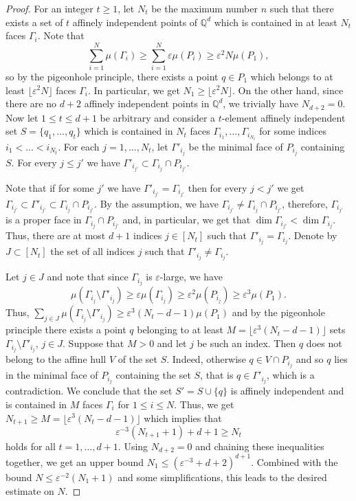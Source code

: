 \documentclass{daj}
\renewcommand{\le}{\leqslant}
\renewcommand{\ge}{\geqslant}
\newcommand{\Q}{\mathbb Q}
\theoremstyle{definition}
\theoremstyle{remark}
\theoremstyle{definition}
\theoremstyle{definition}
\begin{document}
\begin{proof}
For an integer $t\ge 1$, let $N_t$ be the maximum number $n$ such that there exists a set of $t$ affinely independent points of $\Q^d$ which is contained in at least $N_t$ faces $\Gamma_i$. Note that
$$
\sum_{i=1}^N \mu(\Gamma_i) \ge \sum_{i=1}^N \varepsilon\mu(P_i)\ge \varepsilon^2 N \mu(P_1), 
$$
so by the pigeonhole principle, there exists a point $q \in P_1$ which belongs to at least $\lfloor \varepsilon^2 N\rfloor$ faces $\Gamma_i$. In particular, we get $N_1 \ge \lfloor\varepsilon^2 N\rfloor$. On the other hand, since there are no $d+2$ affinely independent points in $\Q^d$, we trivially have $N_{d+2} = 0$. Now let $1\le t \le d+1$ be arbitrary and consider a $t$-element affinely independent set $S= \{q_1, \ldots, q_t\}$ which is contained in $N_t$ faces $\Gamma_{i_1}, \ldots, \Gamma_{i_{N_t}}$ for some indices $i_1 < \ldots < i_{N_t}$. For each $j=1, \ldots, N_t$, let $\Gamma'_{i_j}$ be the minimal face of $P_{i_j}$ containing $S$. For every $j\le j'$ we have $\Gamma'_{i_{j'}} \subset \Gamma_{i_j} \cap P_{i_{j'}}$.

Note that if for some $j'$ we have $\Gamma'_{i_{j'}} = \Gamma_{i_{j'}}$ then for every $j < j'$ we get $\Gamma_{i_{j'}} \subset \Gamma'_{i_{j'}} \subset \Gamma_{i_j} \cap P_{i_{j'}}$. By the assumption, we have $\Gamma_{i_{j'}} \neq \Gamma_{i_j} \cap P_{i_{j'}}$, therefore, $\Gamma_{i_{j'}}$ is a proper face in $\Gamma_{i_j} \cap P_{i_{j'}}$ and, in particular, we get that $\dim \Gamma_{i_{j'}} < \dim \Gamma_{i_j}$. Thus, there are at most $d+1$ indices $j \in [N_t]$ such that $\Gamma'_{i_j} = \Gamma_{i_j}$. Denote by $J \subset [N_t]$ the set of all indices $j$ such that $\Gamma'_{i_j} \neq \Gamma_{i_j}$. 

Let $j \in J$ and note that since $\Gamma_{i_j}$ is $\varepsilon$-large, we have 
$$
\mu(\Gamma_{i_j} \setminus \Gamma'_{i_j}) \ge \varepsilon \mu(\Gamma_{i_j}) \ge \varepsilon^2 \mu(P_{i_j}) \ge \varepsilon^3 \mu(P_1).
$$
Thus, $\sum_{j\in J} \mu(\Gamma_{i_j} \setminus \Gamma'_{i_j}) \ge \varepsilon^3 (N_t - d-1) \mu(P_1)$ and by the pigeonhole principle there exists a point $q$ belonging to at least $M = \lfloor \varepsilon^3 (N_t - d-1)\rfloor$ sets $\Gamma_{i_j} \setminus \Gamma'_{i_j}$, $j\in J$. Suppose that $M > 0$ and let $j$ be such an index. Then $q$ does not belong to the affine hull $V$ of the set $S$. Indeed, otherwise $q \in V \cap P_{i_j}$ and so $q$ lies in the minimal face of $P_{i_j}$ containing the set $S$, that is $q \in \Gamma'_{i_j}$, which is a contradiction. We conclude that the set $S' = S \cup \{q\}$ is affinely independent and is contained in $M$ faces $\Gamma_i$ for $1\le i\le N$. Thus, we get $N_{t+1} \ge M = \lfloor \varepsilon^3 (N_t - d-1)\rfloor$ which implies that
$$
\varepsilon^{-3} (N_{t+1}+1) + d+1 \ge N_t
$$
holds for all $t=1, \ldots, d+1$. Using $N_{d+2} = 0$ and chaining these inequalities together, we get an upper bound $N_1 \le (\varepsilon^{-3} + d + 2)^{d+1}$. Combined with the bound $N \le \varepsilon^{-2} (N_1+1)$ and some simplifications, this leads to the desired estimate on $N$. 
\end{proof}
\end{document}
